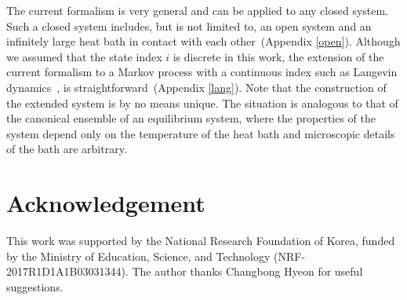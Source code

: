 \documentclass[aps,pre,amsmath,amssymb,floatfix,preprint,nofootinbib]{revtex4}
\begin{document}
  The current formalism is very general and can be applied to any closed system. Such a closed system includes, but is not limited to, an open system and an infinitely large heat bath in contact with each other~(Appendix \ref{open}). Although we assumed that the state index $i$ is discrete in this work, the extension of the current formalism to a Markov process with a continuous index such as Langevin dynamics~\cite{seif1,seif2,hs,sp,hy2}, is straightforward~(Appendix \ref{lang}). Note that the construction of the extended system is by no means unique. The situation is analogous to that of the canonical ensemble of an equilibrium system, where the properties of the system depend only on the temperature of the heat bath and microscopic details of the bath are arbitrary.
   
\section{Acknowledgement} 
This work was supported by the National Research Foundation of Korea, funded by the Ministry of Education, Science, and Technology (NRF-2017R1D1A1B03031344). The author thanks Changbong Hyeon for useful suggestions.
\end{document}
